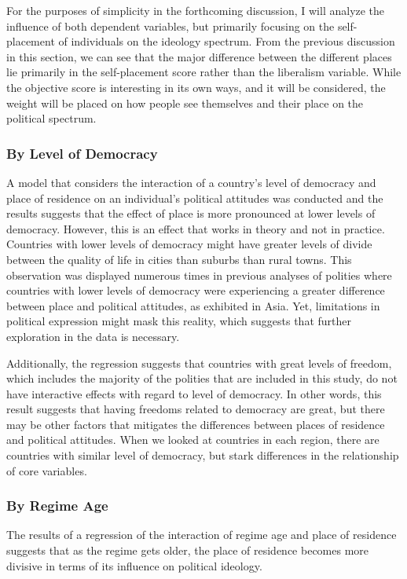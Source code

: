 \documentclass[12pt, titlepage]{article}
\begin{document}
For the purposes of simplicity in the forthcoming discussion, I will analyze the influence of both dependent variables, but primarily focusing on the self-placement of individuals on the ideology spectrum. From the previous discussion in this section, we can see that the major difference between the different places lie primarily in the self-placement score rather than the liberalism variable. While the objective score is interesting in its own ways, and it will be considered, the weight will be placed on how people see themselves and their place on the political spectrum. 

\subsubsection{By Level of Democracy}

A model that considers the interaction of a country's level of democracy and place of residence on an individual's political attitudes was conducted and the results suggests that the effect of place is more pronounced at lower levels of democracy. However, this is an effect that works in theory and not in practice. Countries with lower levels of democracy might have greater levels of divide between the quality of life in cities than suburbs than rural towns. This observation was displayed numerous times in previous analyses of polities where countries with lower levels of democracy were experiencing a greater difference between place and political attitudes, as exhibited in Asia. Yet, limitations in political expression might mask this reality, which suggests that further exploration in the data is necessary. 

Additionally, the regression suggests that countries with great levels of freedom, which includes the majority of the polities that are included in this study, do not have interactive effects with regard to level of democracy. In other words, this result suggests that having freedoms related to democracy are great, but there may be other factors that mitigates the differences between places of residence and political attitudes. When we looked at countries in each region, there are countries with similar level of democracy, but stark differences in the relationship of core variables.

\subsubsection{By Regime Age}

The results of a regression of the interaction of regime age and place of residence suggests that as the regime gets older, the place of residence becomes more divisive in terms of its influence on political ideology. 
\end{document}
